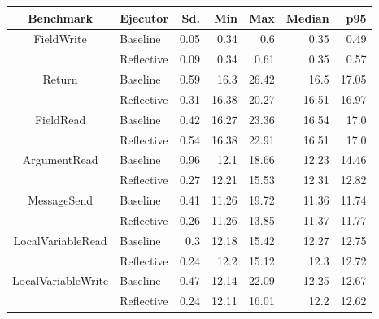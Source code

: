 \begin{center}
\begin{tabular}{ c | l r r r r r}
\toprule
\textbf{Benchmark} & \textbf{Ejecutor} & \textbf{Sd.} & \textbf{Min} & \textbf{Max} & \textbf{Median} & \textbf{p95}\\
\toprule

\multirow{2}{*}{ FieldWrite } & Baseline & 0.05 & 0.34 & 0.6 & 0.35 & 0.49 \\
& Reflective & 0.09 & 0.34 & 0.61 & 0.35 & 0.57 \\
\midrule

\multirow{2}{*}{ Return } & Baseline & 0.59 & 16.3 & 26.42 & 16.5 & 17.05 \\
& Reflective & 0.31 & 16.38 & 20.27 & 16.51 & 16.97 \\
\midrule

\multirow{2}{*}{ FieldRead } & Baseline & 0.42 & 16.27 & 23.36 & 16.54 & 17.0 \\
& Reflective & 0.54 & 16.38 & 22.91 & 16.51 & 17.0 \\
\midrule

\multirow{2}{*}{ ArgumentRead } & Baseline & 0.96 & 12.1 & 18.66 & 12.23 & 14.46 \\
& Reflective & 0.27 & 12.21 & 15.53 & 12.31 & 12.82 \\
\midrule

\multirow{2}{*}{ MessageSend } & Baseline & 0.41 & 11.26 & 19.72 & 11.36 & 11.74 \\
& Reflective & 0.26 & 11.26 & 13.85 & 11.37 & 11.77 \\
\midrule

\multirow{2}{*}{ LocalVariableRead } & Baseline & 0.3 & 12.18 & 15.42 & 12.27 & 12.75 \\
& Reflective & 0.24 & 12.2 & 15.12 & 12.3 & 12.72 \\
\midrule

\multirow{2}{*}{ LocalVariableWrite } & Baseline & 0.47 & 12.14 & 22.09 & 12.25 & 12.67 \\
& Reflective & 0.24 & 12.11 & 16.01 & 12.2 & 12.62 \\
\midrule

\end{tabular}
\end{center}